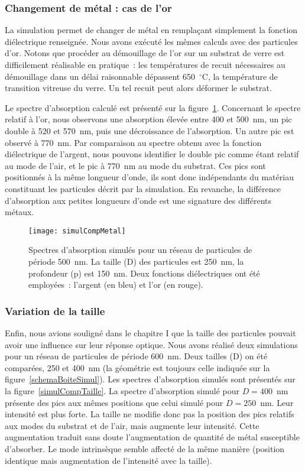 	\subsubsection{Changement de métal : cas de l'or}
La simulation permet de changer de métal en remplaçant simplement la fonction diélectrique renseignée. Nous avons exécuté les mêmes calculs avec des particules d'or. Notons que procéder au démouillage de l'or sur un substrat de verre est difficilement réalisable en pratique~: les températures de recuit nécessaires au démouillage dans un délai raisonnable dépassent 650~$^\circ$C, la température de transition vitreuse du verre. Un tel recuit peut alors déformer le substrat.\par 
Le spectre d'absorption calculé est présenté sur la figure~\ref{simulCompMetal}. Concernant le spectre relatif à l'or, nous observons une absorption élevée entre 400 et 500~nm, un pic double à 520 et 570~nm, puis une décroissance de l'absorption. Un autre pic est observé à 770~nm. Par comparaison au spectre obtenu avec la fonction diélectrique de l'argent, nous pouvons identifier le double pic comme étant relatif au mode de l'air, et le pic à 770~nm au mode du substrat. Ces pics sont positionnés à la même longueur d'onde, ils sont donc indépendants du matériau constituant les particules décrit par la simulation. En revanche, la différence d'absorption aux petites longueurs d'onde est une signature des différents métaux. \par  
\begin{figure}[!htb]
\centering
\texttt{[image: simulCompMetal]}
\caption{Spectres d'absorption simulés pour un réseau de particules de période 500~nm. La taille (D) des particules est 250~nm, la profondeur (p) est 150~nm. Deux fonctions diélectriques ont été employées~: l'argent (en bleu) et l'or (en rouge).}
\label{simulCompMetal}
\end{figure}

	\subsubsection{Variation de la taille}
Enfin, nous avions souligné dans le chapitre I que la taille des particules pouvait avoir une influence sur leur réponse optique. Nous avons réalisé deux simulations pour un réseau de particules de période 600~nm. Deux tailles (D) on été comparées, 250 et 400~nm (la géométrie est toujours celle indiquée sur la figure~\ref{schemaBoiteSimul}). Les spectres d'absorption simulés sont présentés sur la figure~\ref{simulCompTaille}. La spectre d'absorption simulé pour $D = 400$~nm présente des pics aux mêmes positions que celui simulé pour $D = 250$~nm. Leur intensité est plus forte. La taille ne modifie donc pas la position des pics relatifs aux modes du substrat et de l'air, mais augmente leur intensité. Cette augmentation traduit sans doute l'augmentation de quantité de métal susceptible d'absorber. Le mode intrinsèque semble affecté de la même manière (position identique mais augmentation de l'intensité avec la taille).\par 

